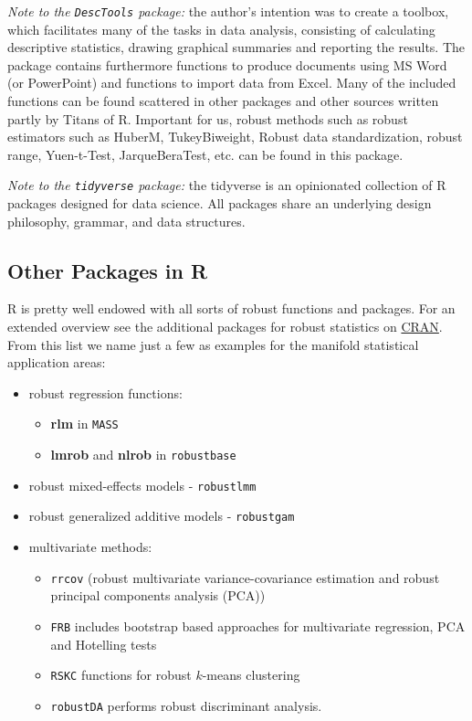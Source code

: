 \documentclass[
]{article}
\providecommand{\tightlist}{%
  \setlength{\itemsep}{0pt}\setlength{\parskip}{0pt}}
\begin{document}
\emph{Note to the \texttt{DescTools} package:} the author's intention was to create a toolbox, which facilitates many of the tasks in data analysis, consisting of calculating descriptive statistics, drawing graphical summaries and reporting the results. The package contains furthermore functions to produce documents using MS Word (or PowerPoint) and functions to import data from Excel. Many of the included functions can be found scattered in other packages and other sources written partly by Titans of R. Important for us, robust methods such as robust estimators such as HuberM, TukeyBiweight, Robust data standardization, robust range, Yuen-t-Test, JarqueBeraTest, etc. can be found in this package.

\emph{Note to the \texttt{tidyverse} package:} the tidyverse is an opinionated collection of R packages designed for data science. All packages share an underlying design philosophy, grammar, and data structures.

\subsection*{Other Packages in R}\label{other-packages-in-r}

R is pretty well endowed with all sorts of robust functions and packages. For an extended overview see the additional packages for robust statistics on \href{https://cran.r-project.org/web/views/Robust.html}{CRAN}. From this list we name just a few as examples for the manifold statistical application areas:

\begin{itemize}
\tightlist
\item
  robust regression functions:

  \begin{itemize}
  \tightlist
  \item
    \textbf{rlm} in \texttt{MASS}\\
  \item
    \textbf{lmrob} and \textbf{nlrob} in \texttt{robustbase}
  \end{itemize}
\item
  robust mixed-effects models - \texttt{robustlmm}
\item
  robust generalized additive models - \texttt{robustgam}
\item
  multivariate methods:

  \begin{itemize}
  \tightlist
  \item
    \texttt{rrcov} (robust multivariate variance-covariance estimation and robust principal components analysis (PCA))
  \item
    \texttt{FRB} includes bootstrap based approaches for multivariate regression, PCA and Hotelling tests
  \item
    \texttt{RSKC} functions for robust \(k\)-means clustering
  \item
    \texttt{robustDA} performs robust discriminant analysis.
  \end{itemize}
\end{itemize}
\end{document}
